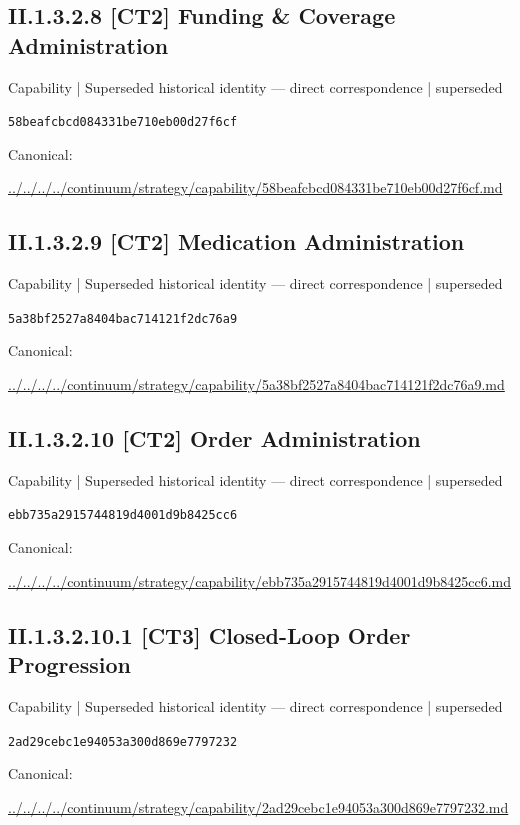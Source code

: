 \documentclass[10pt,a4paper]{article}
\begin{document}
\subsection*{II.1.3.2.8 [CT2] Funding \& Coverage Administration}
{\small Capability | Superseded historical identity — direct correspondence | superseded}\par
\texttt{58beafcbcd084331be710eb00d27f6cf}\par
Canonical: \par
{\footnotesize\url{../../../../continuum/strategy/capability/58beafcbcd084331be710eb00d27f6cf.md}}\par
\subsection*{II.1.3.2.9 [CT2] Medication Administration}
{\small Capability | Superseded historical identity — direct correspondence | superseded}\par
\texttt{5a38bf2527a8404bac714121f2dc76a9}\par
Canonical: \par
{\footnotesize\url{../../../../continuum/strategy/capability/5a38bf2527a8404bac714121f2dc76a9.md}}\par
\subsection*{II.1.3.2.10 [CT2] Order Administration}
{\small Capability | Superseded historical identity — direct correspondence | superseded}\par
\texttt{ebb735a2915744819d4001d9b8425cc6}\par
Canonical: \par
{\footnotesize\url{../../../../continuum/strategy/capability/ebb735a2915744819d4001d9b8425cc6.md}}\par
\subsection*{II.1.3.2.10.1 [CT3] Closed-Loop Order Progression}
{\small Capability | Superseded historical identity — direct correspondence | superseded}\par
\texttt{2ad29cebc1e94053a300d869e7797232}\par
Canonical: \par
{\footnotesize\url{../../../../continuum/strategy/capability/2ad29cebc1e94053a300d869e7797232.md}}\par
\end{document}

